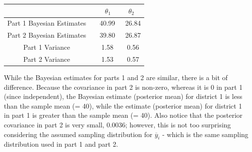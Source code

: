 \documentclass[10pt,a4paper]{article}
\begin{document}
\begin{table}[h]
\centering
\begin{tabular}{c c c}
\hline\hline
& \ \ $\theta_1$ & $\theta_2$ \\
\hline\hline
Part 1 Bayesian Estimates & \ \ 40.99 & \ 26.84 \\ 
\hline
Part 2 Bayesian Estimates & \ \ 39.80 & \ 26.87  \\  
\hline
Part 1 Variance & \ \ 1.58 & \ 0.56 \\
\hline
Part 2 Variance & \ \ 1.53 & \ 0.57 \\
\hline\hline
\end{tabular}
\label{tab:hresult}
\end{table}

While the Bayesian estimates for parts 1 and 2 are similar, there is a bit of difference. Because the covariance in part 2 is non-zero, whereas it is 0 in part 1 (since independent), the Bayesian estimate (posterior mean) for district 1 is less than the sample mean (= 40), while the estimate (posterior mean) for district 1 in part 1 is greater than the sample mean (= 40). 
Also notice that the posterior covariance in part 2 is very small, 0.0036; however, this is not too surprising considering the assumed sampling distribution for $\overline{y}_i$ - which is the same sampling distribution used in part 1 and part 2.
\end{document}
